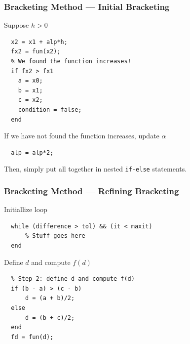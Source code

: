 \documentclass[11pt,xcolor={svgnames},aspectratio=169,usepdftitle=false]{beamer}
\let\toneitemize\itemize
\let\ttwoitemize\enditemize
\renewenvironment{itemize}{\toneitemize\addtolength{\itemsep}{0.7\baselineskip}}{\ttwoitemize}
\begin{document}
\begin{frame}[fragile]
  \frametitle{Bracketing Method --- Initial Bracketing}
\begin{itemize}
  \item Suppose $h > 0$
  \begin{lstlisting}
  x2 = x1 + alp*h;
  fx2 = fun(x2);
  % We found the function increases!
  if fx2 > fx1
    a = x0;
    b = x1;
    c = x2;
    condition = false;
  end
  \end{lstlisting}
  \item If we have not found the function increases, update $\alpha$
  \begin{lstlisting}
  alp = alp*2;
  \end{lstlisting}
  \item Then, simply put all together in nested \verb;if-else; statements.
\end{itemize}
\end{frame}

\begin{frame}[fragile]
  \frametitle{Bracketing Method --- Refining Bracketing}
\begin{itemize}
  \item Initiallize loop
  \begin{lstlisting}
  while (difference > tol) && (it < maxit)
      % Stuff goes here
  end
  \end{lstlisting}
  \item Define $d$ and compute $f(d)$
  \begin{lstlisting}
  % Step 2: define d and compute f(d)
  if (b - a) > (c - b)
      d = (a + b)/2;
  else
      d = (b + c)/2;
  end
  fd = fun(d);
  \end{lstlisting}
\end{itemize}
\end{frame}
\end{document}
